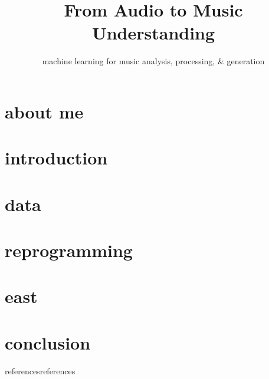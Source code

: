 

\title{From Audio to Music Understanding}
\subtitle{machine learning for music analysis, processing, \& generation} 


	

    \section[about]{about me}
        
        
    \section[intro]{introduction}
        
        
        
    \section{data}
        
    
    \section{reprogramming}
        
    
    \section{east}
        
    

    \section{conclusion}
        
        

    \begin{frame}[allowframebreaks]{references}{references}
        \printbibliography[title=references]
    \end{frame}



